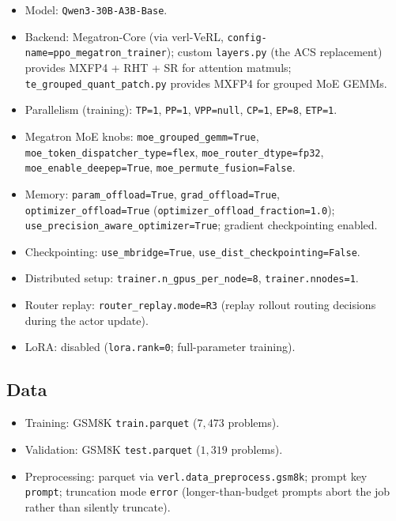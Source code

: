 \begin{itemize}\setlength{\itemsep}{1pt}
  \item Model: \texttt{Qwen3-30B-A3B-Base}.
  \item Backend: Megatron-Core (via verl-VeRL,
        \texttt{config-name=ppo\_megatron\_trainer}); custom
        \texttt{layers.py} (the ACS replacement) provides MXFP4 + RHT
        + SR for attention matmuls; \texttt{te\_grouped\_quant\_patch.py}
        provides MXFP4 for grouped MoE GEMMs.
  \item Parallelism (training): \texttt{TP=1}, \texttt{PP=1},
        \texttt{VPP=null}, \texttt{CP=1}, \texttt{EP=8},
        \texttt{ETP=1}.
  \item Megatron MoE knobs: \texttt{moe\_grouped\_gemm=True},
        \texttt{moe\_token\_dispatcher\_type=flex},
        \texttt{moe\_router\_dtype=fp32},
        \texttt{moe\_enable\_deepep=True},
        \texttt{moe\_permute\_fusion=False}.
  \item Memory: \texttt{param\_offload=True},
        \texttt{grad\_offload=True},
        \texttt{optimizer\_offload=True}
        (\texttt{optimizer\_offload\_fraction=1.0});
        \texttt{use\_precision\_aware\_optimizer=True};
        gradient checkpointing enabled.
  \item Checkpointing: \texttt{use\_mbridge=True},
        \texttt{use\_dist\_checkpointing=False}.
  \item Distributed setup: \texttt{trainer.n\_gpus\_per\_node=8},
        \texttt{trainer.nnodes=1}.
  \item Router replay: \texttt{router\_replay.mode=R3} (replay rollout
        routing decisions during the actor update).
  \item LoRA: disabled (\texttt{lora.rank=0}; full-parameter training).
\end{itemize}

\subsection*{Data}

\begin{itemize}\setlength{\itemsep}{1pt}
  \item Training: GSM8K \texttt{train.parquet} ($7{,}473$ problems).
  \item Validation: GSM8K \texttt{test.parquet} ($1{,}319$ problems).
  \item Preprocessing: parquet via \texttt{verl.data\_preprocess.gsm8k};
        prompt key \texttt{prompt}; truncation mode \texttt{error}
        (longer-than-budget prompts abort the job rather than silently
        truncate).
\end{itemize}

